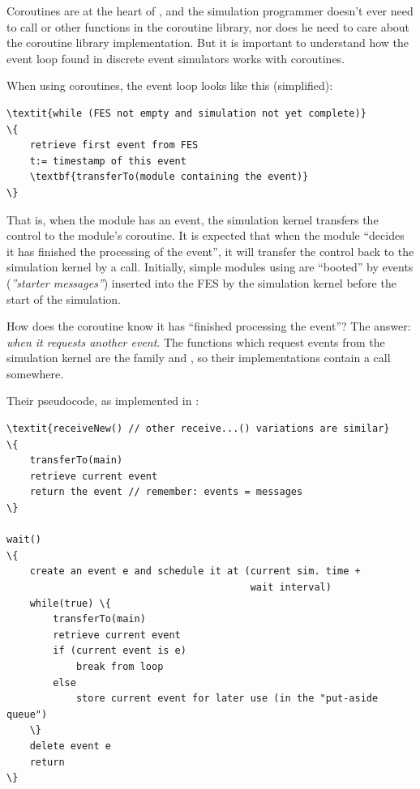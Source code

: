 Coroutines are at the heart of {\opp}, and the
simulation programmer doesn't ever need to call 
or other functions in the coroutine library, nor does he need to care
about the coroutine library implementation. But it is important to
understand how the event loop found in discrete event simulators works
with coroutines.


When using coroutines, the event loop looks like
this (simplified):


\begin{Verbatim}[commandchars=\\\{\}]
\textit{while (FES not empty and simulation not yet complete)}
\{
    retrieve first event from FES
    t:= timestamp of this event
    \textbf{transferTo(module containing the event)}
\}
\end{Verbatim}



That is, when the module has an event, the simulation
kernel transfers the control to the module's coroutine. It is expected
that when the module ``decides it has finished the processing of the
event'', it will transfer the control back to the simulation kernel by
a  call. Initially,
simple modules using  are
``booted'' by events (\textit{''starter messages''})
inserted into the FES by the simulation kernel before the
start of the simulation.


How does the coroutine know it has ``finished processing the event''?
The answer: \textit{when it requests another event}.  The functions
which request events from the simulation kernel are the
 family and , so their
implementations contain a  call
somewhere.


Their pseudocode, as implemented in {\opp}:


\begin{Verbatim}[commandchars=\\\{\}]
\textit{receiveNew() // other receive...() variations are similar}
\{
    transferTo(main)
    retrieve current event
    return the event // remember: events = messages
\}

wait()
\{
    create an event e and schedule it at (current sim. time +
                                          wait interval)
    while(true) \{
        transferTo(main)
        retrieve current event
        if (current event is e)
            break from loop
        else
            store current event for later use (in the "put-aside queue")
    \}
    delete event e
    return
\}
\end{Verbatim}



